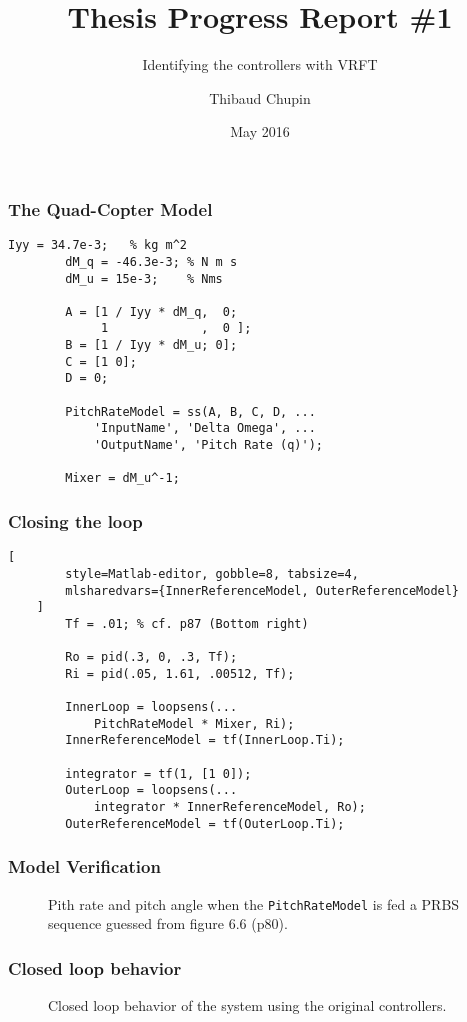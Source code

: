 \documentclass{beamer}
\title{Thesis Progress Report \#1}
\subtitle{Identifying the controllers with VRFT}
\author{Thibaud Chupin}
\date{May 2016}
\newlength\figureheight            %
\begin{document}
\frame{\titlepage}

\begin{frame}[fragile]
	\frametitle{The Quad-Copter Model}
	
	\begin{lstlisting}[style=Matlab-editor, gobble=8, tabsize=4]
		Iyy = 34.7e-3;   % kg m^2
		dM_q = -46.3e-3; % N m s
		dM_u = 15e-3;    % Nms
		
		A = [1 / Iyy * dM_q,  0;
			 1             ,  0 ];
		B = [1 / Iyy * dM_u; 0];
		C = [1 0];
		D = 0;
		
		PitchRateModel = ss(A, B, C, D, ...
			'InputName', 'Delta Omega', ...
			'OutputName', 'Pitch Rate (q)');
		
		Mixer = dM_u^-1;
	\end{lstlisting}
\end{frame}

\begin{frame}[fragile]
	\frametitle{Closing the loop}
	
	\begin{lstlisting}[
		style=Matlab-editor, gobble=8, tabsize=4,
		mlsharedvars={InnerReferenceModel, OuterReferenceModel}
	]
		Tf = .01; % cf. p87 (Bottom right)
		
		Ro = pid(.3, 0, .3, Tf);
		Ri = pid(.05, 1.61, .00512, Tf); 

		InnerLoop = loopsens(...
			PitchRateModel * Mixer, Ri);
		InnerReferenceModel = tf(InnerLoop.Ti);
		
		integrator = tf(1, [1 0]);
		OuterLoop = loopsens(...
			integrator * InnerReferenceModel, Ro);
		OuterReferenceModel = tf(OuterLoop.Ti);
	\end{lstlisting}
\end{frame}

\begin{frame}[fragile]
	\frametitle{Model Verification}
	
	\begin{figure}
		
		\caption{Pith rate and pitch angle when the \texttt{PitchRateModel} is fed a PRBS sequence guessed from figure 6.6 (p80).}
	\end{figure}
\end{frame}

\begin{frame}
	\frametitle{Closed loop behavior}
	
	\begin{figure}
		\setlength\figureheight{5cm} 
		
		\caption{Closed loop behavior of the system using the original controllers.}
	\end{figure}
\end{frame}
\end{document}
